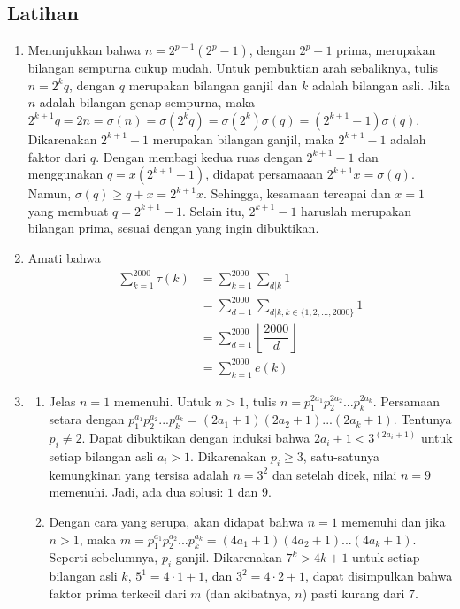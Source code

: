 \documentclass[11pt]{scrartcl}
\begin{document}
\subsection{Latihan}
\begin{enumerate}
    \item Menunjukkan bahwa $n = 2^{p - 1}(2^p - 1)$, dengan $2^p - 1$ prima, merupakan bilangan sempurna cukup mudah. Untuk pembuktian arah sebaliknya, tulis $n = 2^kq$, dengan $q$ merupakan bilangan ganjil dan $k$ adalah bilangan asli. Jika $n$ adalah bilangan genap sempurna, maka $2^{k + 1}q = 2n = \sigma(n) = \sigma(2^kq) = \sigma(2^k)\sigma(q) = (2^{k + 1} - 1)\sigma(q)$. Dikarenakan $2^{k + 1} - 1$ merupakan bilangan ganjil, maka $2^{k + 1} - 1$ adalah faktor dari $q$. Dengan membagi kedua ruas dengan $2^{k + 1} - 1$ dan menggunakan $q = x(2^{k + 1}  - 1)$, didapat persamaaan $2^{k + 1}x = \sigma(q)$. Namun, $\sigma(q) \geq q + x = 2^{k + 1}x$. Sehingga, kesamaan tercapai dan $x = 1$ yang membuat $q = 2^{k + 1} - 1$. Selain itu, $2^{k + 1} - 1$ haruslah merupakan bilangan prima, sesuai dengan yang ingin dibuktikan. 
    \item Amati bahwa
    \begin{align*}
    \sum_{k=1}^{2000}\tau(k) &= \sum_{k=1}^{2000}\sum_{d|k}1 \\
    &= \sum_{d=1}^{2000}\sum_{d|k,k\in\{1,2,...,2000\}}1 \\
    &= \sum_{d=1}^{2000} \left\lfloor\dfrac{2000}{d} \right \rfloor\\
    &=\sum_{k=1}^{2000}e(k)
    \end{align*}
    \item 
    \begin{enumerate}
        \item Jelas $n = 1$ memenuhi. Untuk $n>1$, tulis $n = p_1^{2a_1}p_2^{2a_2}...p_k^{2a_k}$. Persamaan setara dengan $p_1^{a_1} p_2^{a_2}...p_k^{a_k} = (2a_1 + 1)(2a_2 + 1)...(2a_k + 1)$. Tentunya $p_i \neq 2$. Dapat dibuktikan dengan induksi bahwa $2a_i + 1 < 3^(2a_i + 1)$ untuk setiap bilangan asli $a_i > 1$. Dikarenakan $p_i \geq 3$, satu-satunya kemungkinan yang tersisa adalah $n = 3^2$ dan setelah dicek, nilai $n = 9$ memenuhi. Jadi, ada dua solusi: $1$ dan $9$.
        \item Dengan cara yang serupa, akan didapat bahwa $n = 1$ memenuhi dan jika $n > 1$, maka $m = p_1^{a_1} p_2^{a_2}...p_k^{a_k} = (4a_1 + 1)(4a_2 + 1)...(4a_k + 1)$. Seperti sebelumnya, $p_i$ ganjil. Dikarenakan $7^k > 4k + 1$ untuk setiap bilangan asli $k$, $5^1 = 4\cdot 1 + 1$, dan $3^2 = 4\cdot 2 + 1$, dapat disimpulkan bahwa faktor prima terkecil dari $m$ (dan akibatnya, $n$) pasti kurang dari $7$. 
        

\end{enumerate}
\end{enumerate}
\end{document}
